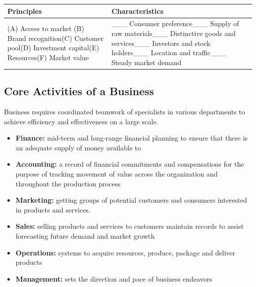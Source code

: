 \documentclass[]{book}
\providecommand{\tightlist}{%
  \setlength{\itemsep}{0pt}\setlength{\parskip}{0pt}}
\begin{document}
\begin{longtable}[]{@{}ll@{}}
\toprule
\begin{minipage}[b]{0.44\columnwidth}\raggedright
Principles\strut
\end{minipage} & \begin{minipage}[b]{0.50\columnwidth}\raggedright
Characteristics\strut
\end{minipage}\tabularnewline
\midrule
\endhead
\begin{minipage}[t]{0.44\columnwidth}\raggedright
(A) Access to market \newline(B) Brand recognition\newline (C) Customer pool\newline(D) Investment capital\newline(E) Resources\newline(F) Market value\strut
\end{minipage} & \begin{minipage}[t]{0.50\columnwidth}\raggedright
\_\_\_ Consumer preference\newline  \_\_\_ Supply of raw materials\newline \_\_\_ Distinctive goods and services\newline\_\_\_ Investors and stock holders\newline \_\_\_ Location and traffic\newline\_\_\_ Steady market demand\strut
\end{minipage}\tabularnewline
\bottomrule
\end{longtable}

\hypertarget{core-activities-of-a-business}{%
\subsection{Core Activities of a Business}\label{core-activities-of-a-business}}

Business requires coordinated teamwork of specialists in various departments to achieve efficiency and effectiveness on a large scale.

\begin{itemize}
\tightlist
\item
  \textbf{Finance:} mid-term and long-range financial planning to ensure that there is an adequate supply of money available to
\item
  \textbf{Accounting:} a record of financial commitments and compensations for the purpose of tracking movement of value across the organization and throughout the production process
\item
  \textbf{Marketing:} getting groups of potential customers and consumers interested in products and services.
\item
  \textbf{Sales:} selling products and services to customers maintain records to assist forecasting future demand and market growth
\item
  \textbf{Operations:} systems to acquire resources, produce, package and deliver products
\item
  \textbf{Management:} sets the direction and pace of business endeavors
\end{itemize}
\end{document}
